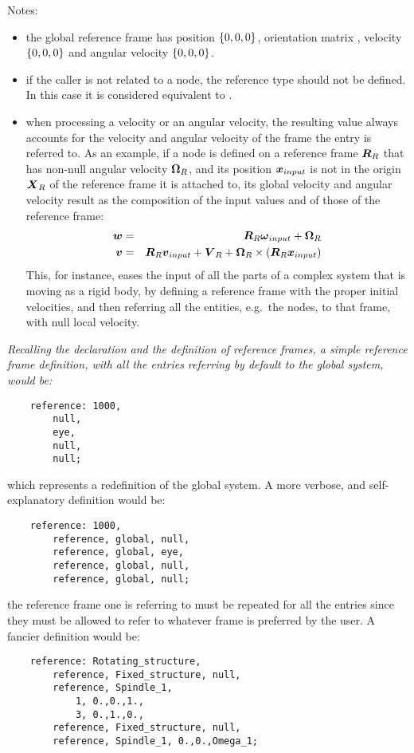 Notes: 
\begin{itemize}
    \item the global reference frame has position $ \left\{ 0, 0, 0 \right\} $,
    orientation matrix , velocity $ \left\{ 0, 0, 0 \right\} $ and angular
    velocity $ \left\{ 0, 0, 0 \right\} $.
    \item if the caller is not related to a node, the reference type
     should not be defined. 
    In this case it is considered equivalent to .
    \item when processing a velocity or an angular velocity, the resulting
    value always accounts for the velocity and angular velocity of the frame
    the entry is referred to. 
    As an example, if a node is defined on a reference frame $\boldsymbol{R}_R$
    that has non-null angular velocity $ \boldsymbol{\Omega}_R $, and its position 
    $ \boldsymbol{x}_{input} $ is not in the origin $ \boldsymbol{X}_R $ of the reference frame
    it is attached to, its global velocity and angular velocity result
    as the composition of the input values and of those of the reference 
    frame:
    \begin{eqnarray*}    
        \boldsymbol{w} & = & \boldsymbol{R}_R \boldsymbol{\omega}_{input} + \boldsymbol{\Omega}_R \\
	\boldsymbol{v} & = & \boldsymbol{R}_R \boldsymbol{v}_{input} + \boldsymbol{V}_R
		+\boldsymbol{\Omega}_R\times\left( \boldsymbol{R}_R \boldsymbol{x}_{input} \right)
    \end{eqnarray*}
    This, for instance, eases the input of all the parts of a complex system
    that is moving as a rigid body, by defining a reference frame with the
    proper initial velocities, and then referring all the entities, e.g.\ the 
    nodes, to that frame, with null local velocity.
\end{itemize}  
{\em
    Recalling the declaration and the definition of reference frames,
    a simple reference frame definition, with all the entries referring 
    by default to the global system, would be:
    \begin{verbatim}
    reference: 1000,
        null,
        eye,
        null,
        null;			 
    \end{verbatim}
    which represents a redefinition of the global system.
    A more verbose, and self-explanatory definition would be:
    \begin{verbatim}
    reference: 1000,
        reference, global, null,
        reference, global, eye,
        reference, global, null,
        reference, global, null;			 
    \end{verbatim}
    the reference frame one is referring to must be repeated for all the entries
    since they must be allowed to refer to whatever frame is preferred 
    by the user.
    A fancier definition would be:
    \begin{verbatim}
    reference: Rotating_structure, 
        reference, Fixed_structure, null,
        reference, Spindle_1,
            1, 0.,0.,1., 
            3, 0.,1.,0.,
        reference, Fixed_structure, null,
        reference, Spindle_1, 0.,0.,Omega_1;
    \end{verbatim}
}

